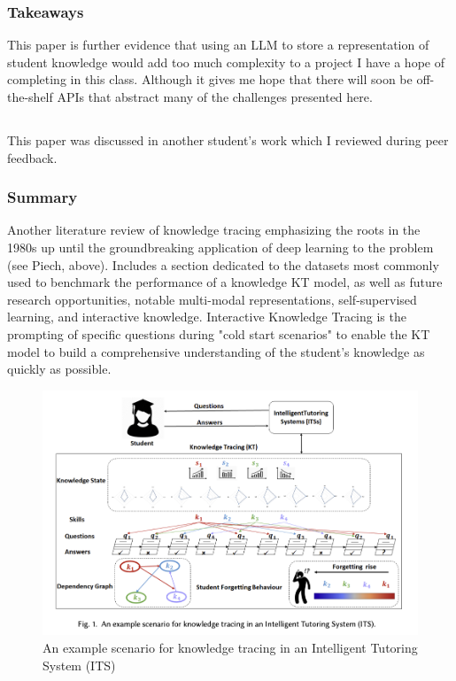 \documentclass[
	letterpaper, %
]{jdf}
\begin{document}
\subsubsection{Takeaways}
This paper is further evidence that using an LLM to store a representation of student knowledge would add too much complexity to a project I have a hope of completing in this class. Although it gives me hope that there will soon be off-the-shelf APIs that abstract many of the challenges presented here.

\subsection{}
This paper was discussed in another student's work which I reviewed during peer feedback.

\subsubsection{Summary}
Another literature review of knowledge tracing emphasizing the roots in the 1980s up until the groundbreaking application of deep learning to the problem (see Piech, above). Includes a section dedicated to the datasets most commonly used to benchmark the performance of a knowledge KT model, as well as future research opportunities, notable multi-modal representations, self-supervised learning, and interactive knowledge. Interactive Knowledge Tracing is the prompting of specific questions during "cold start scenarios" to enable the KT model to build a comprehensive understanding of the student's knowledge as quickly as possible.

\begin{figure}
    \centering
    \includegraphics[width=0.5\linewidth]{Assignments//Assignment 3/knowledge_tracing_survey.png}
    \caption{An example scenario for knowledge tracing in an Intelligent Tutoring System (ITS)}
    \label{fig:enter-label}
\end{figure}
\end{document}
